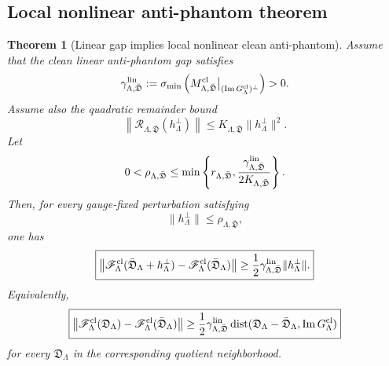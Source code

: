 \documentclass[11pt]{article}
\numberwithin{equation}{section}
\newtheorem{theorem}{Theorem}[section]
\begin{document}
\subsection{Local nonlinear anti-phantom theorem}

\begin{theorem}[Linear gap implies local nonlinear clean anti-phantom]
\label{thm:linear-gap-to-nonlinear-gap}
Assume that the clean linear anti-phantom gap satisfies
\[
        \gamma_{\Lambda,\bar{\mathfrak D}}^{\rm lin}
        :=
        \sigma_{\min}
        \left(
        M_{\Lambda,\bar{\mathfrak D}}^{\rm cl}
        \big|_{(\operatorname{Im}G_\Lambda^{\rm cl})^\perp}
        \right)
        >0 .
\]
Assume also the quadratic remainder bound
\[
        \left\|
        \mathscr R_{\Lambda,\bar{\mathfrak D}}(h_\Lambda^\perp)
        \right\|
        \le
        K_{\Lambda,\bar{\mathfrak D}}
        \|h_\Lambda^\perp\|^2 .
\]
Let
\[
        0<\rho_{\Lambda,\bar{\mathfrak D}}
        \le
        \min\left\{
        r_{\Lambda,\bar{\mathfrak D}},
        \frac{\gamma_{\Lambda,\bar{\mathfrak D}}^{\rm lin}}
        {2K_{\Lambda,\bar{\mathfrak D}}}
        \right\}.
\]
Then, for every gauge-fixed perturbation satisfying
\[
        \|h_\Lambda^\perp\|
        \le
        \rho_{\Lambda,\bar{\mathfrak D}},
\]
one has
\[
\boxed{
        \left\|
        \mathscr F_\Lambda^{\rm cl}
        (\bar{\mathfrak D}_\Lambda+h_\Lambda^\perp)
        -
        \mathscr F_\Lambda^{\rm cl}(\bar{\mathfrak D}_\Lambda)
        \right\|
        \ge
        \frac12
        \gamma_{\Lambda,\bar{\mathfrak D}}^{\rm lin}
        \|h_\Lambda^\perp\| .
}
\]
Equivalently,
\[
\boxed{
        \left\|
        \mathscr F_\Lambda^{\rm cl}
        (\mathfrak D_\Lambda)
        -
        \mathscr F_\Lambda^{\rm cl}(\bar{\mathfrak D}_\Lambda)
        \right\|
        \ge
        \frac12
        \gamma_{\Lambda,\bar{\mathfrak D}}^{\rm lin}
        \operatorname{dist}
        (\mathfrak D_\Lambda-\bar{\mathfrak D}_\Lambda,
        \operatorname{Im}G_\Lambda^{\rm cl})
}
\]
for every \(\mathfrak D_\Lambda\) in the corresponding quotient
neighborhood.
\end{theorem}
\end{document}
